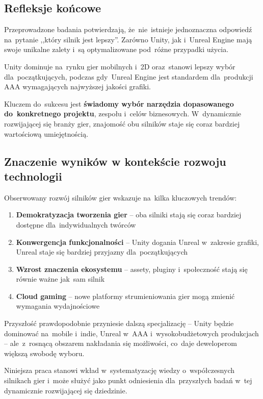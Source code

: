 \subsection{Refleksje końcowe}

Przeprowadzone badania potwierdzają, że~nie~istnieje jednoznaczna odpowiedź na~pytanie ,,który silnik jest lepszy''. Zarówno Unity, jak i~Unreal Engine mają swoje unikalne zalety i~są optymalizowane pod~różne przypadki użycia.

Unity dominuje na~rynku gier mobilnych i~2D oraz~stanowi lepszy wybór dla~początkujących, podczas gdy~Unreal Engine jest standardem dla~produkcji AAA wymagających najwyższej jakości grafiki.

Kluczem do~sukcesu jest \textbf{świadomy wybór narzędzia dopasowanego do~konkretnego projektu}, zespołu i~celów biznesowych. W~dynamicznie rozwijającej się branży gier, znajomość obu silników staje się coraz bardziej wartościową umiejętnością.

\subsection{Znaczenie wyników w kontekście rozwoju technologii}

Obserwowany rozwój silników gier wskazuje na~kilka kluczowych trendów:

\begin{enumerate}
    \item \textbf{Demokratyzacja tworzenia gier} -- oba silniki stają się coraz bardziej dostępne dla~indywidualnych twórców
    \item \textbf{Konwergencja funkcjonalności} -- Unity dogania Unreal w~zakresie grafiki, Unreal staje się bardziej przyjazny dla~początkujących
    \item \textbf{Wzrost znaczenia ekosystemu} -- assety, pluginy i~społeczność stają się równie ważne jak~sam silnik
    \item \textbf{Cloud gaming} -- nowe platformy strumieniowania gier mogą zmienić wymagania wydajnościowe
\end{enumerate}

Przyszłość prawdopodobnie przyniesie dalszą specjalizację -- Unity będzie dominować na~mobile i~indie, Unreal w~AAA i~wysokobudżetowych produkcjach -- ale~z~rosnącą obszarem nakładania się możliwości, co~daje deweloperom większą swobodę wyboru.

\vspace{1cm}

\noindent
Niniejsza praca stanowi wkład w~systematyzację wiedzy o~współczesnych silnikach gier i~może służyć jako punkt odniesienia dla~przyszłych badań w~tej dynamicznie rozwijającej się dziedzinie.
